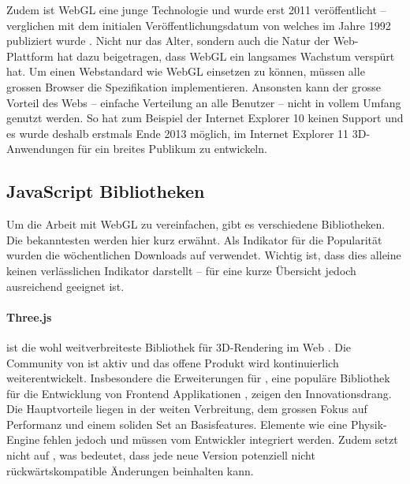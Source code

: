 Zudem ist WebGL eine junge Technologie und wurde erst 2011 veröffentlicht \cite{webGl1Spec} – verglichen mit dem initialen Veröffentlichungsdatum von  welches im Jahre 1992 publiziert wurde \cite{openGlSpec}.
Nicht nur das Alter, sondern auch die Natur der Web-Plattform hat dazu beigetragen, dass WebGL ein langsames Wachstum verspürt hat. Um einen Webstandard wie WebGL einsetzen zu können, müssen alle grossen Browser die Spezifikation implementieren. Ansonsten kann der grosse Vorteil des Webs – einfache Verteilung an alle Benutzer – nicht in vollem Umfang genutzt werden. So hat zum Beispiel der Internet Explorer 10 keinen Support und es wurde deshalb erstmals Ende 2013 möglich, im Internet Explorer 11 3D-Anwendungen für ein breites Publikum zu entwickeln.

\subsection{JavaScript Bibliotheken}
Um die Arbeit mit WebGL zu vereinfachen, gibt es verschiedene  Bibliotheken. Die bekanntesten werden hier kurz erwähnt. Als Indikator für die Popularität wurden die wöchentlichen Downloads auf  verwendet. Wichtig ist, dass dies alleine keinen verlässlichen Indikator darstellt – für eine kurze Übersicht jedoch ausreichend geeignet ist.

\paragraph{Three.js}
 ist die wohl weitverbreiteste Bibliothek für 3D-Rendering im Web \cite{threeNpmPackage}.
Die Community von  ist aktiv und das offene Produkt wird kontinuierlich weiterentwickelt. Insbesondere die Erweiterungen \cite{threeFiberGithub} für , eine populäre Bibliothek für die Entwicklung von Frontend Applikationen \cite{reactNpmPackage}, zeigen den Innovationsdrang.
Die Hauptvorteile liegen in der weiten Verbreitung, dem grossen Fokus auf Performanz und einem soliden Set an Basisfeatures. Elemente wie eine Physik-Engine fehlen jedoch und müssen vom Entwickler integriert werden. Zudem setzt  nicht auf , was bedeutet, dass jede neue Version potenziell nicht rückwärtskompatible Änderungen beinhalten kann.

